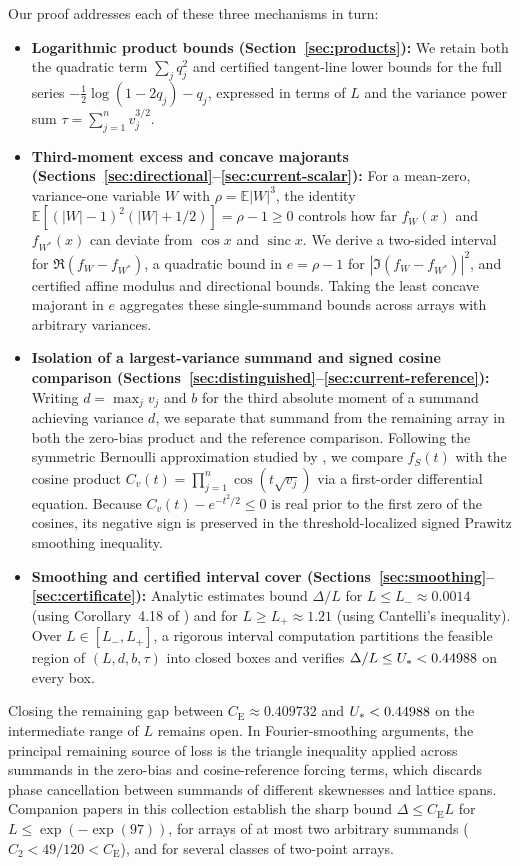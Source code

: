\documentclass[11pt]{article}
\numberwithin{equation}{section}
\theoremstyle{remark}
\DeclareMathOperator{\sinc}{sinc}
\newcommand{\E}{\mathbb E}
\newcommand{\CE}{C_{\mathrm E}}
\begin{document}
Our proof addresses each of these three mechanisms in turn:
\begin{itemize}[leftmargin=2em]
\item \textbf{Logarithmic product bounds (Section~\ref{sec:products}):} We
retain both the quadratic term $\sum_jq_j^2$ and certified tangent-line
lower bounds for the full series $-\frac12\log(1-2q_j)-q_j$, expressed in
terms of $L$ and the variance power sum $\tau=\sum_{j=1}^n v_j^{3/2}$.
\item \textbf{Third-moment excess and concave majorants
(Sections~\ref{sec:directional}--\ref{sec:current-scalar}):} For a
mean-zero, variance-one variable $W$ with $\rho=\E|W|^3$, the identity
$\E[(|W|-1)^2(|W|+1/2)]=\rho-1\ge0$ controls how far $f_W(x)$ and
$f_{W^*}(x)$ can deviate from $\cos x$ and $\sinc x$. We derive a two-sided
interval for $\Re(f_W-f_{W^*})$, a quadratic bound in $e=\rho-1$ for
$|\Im(f_W-f_{W^*})|^2$, and certified affine modulus and directional bounds.
Taking the least concave majorant in $e$ aggregates these single-summand
bounds across arrays with arbitrary variances.
\item \textbf{Isolation of a largest-variance summand and signed cosine
comparison (Sections~\ref{sec:distinguished}--\ref{sec:current-reference}):}
Writing $d=\max_j v_j$ and $b$ for the third absolute moment of a summand
achieving variance $d$, we separate that summand from the remaining array in
both the zero-bias product and the reference comparison. Following the
symmetric Bernoulli approximation studied by \citet[Theorem~1.2 and Example~1.4]{MattnerShevtsova2019},
we compare $f_S(t)$ with the cosine product $C_v(t)=\prod_{j=1}^n\cos(t\sqrt{v_j})$
via a first-order differential equation. Because $C_v(t)-e^{-t^2/2}\le0$ is
real prior to the first zero of the cosines, its negative sign is preserved
in the threshold-localized signed Prawitz smoothing inequality.
\item \textbf{Smoothing and certified interval cover
(Sections~\ref{sec:smoothing}--\ref{sec:certificate}):} Analytic estimates
bound $\Delta/L$ for $L\le L_-\approx0.0014$ (using Corollary~4.18 of
\citet{Shevtsova2012}) and for $L\ge L_+\approx1.21$ (using Cantelli's
inequality). Over $L\in[L_-,L_+]$, a rigorous interval computation partitions
the feasible region of $(L,d,b,\tau)$ into closed boxes and verifies
$\Delta/L\le U_*<0.44988$ on every box.
\end{itemize}

Closing the remaining gap between $\CE\approx0.409732$ and $U_*<0.44988$
on the intermediate range of $L$ remains open. In Fourier-smoothing
arguments, the principal remaining source of loss is the triangle inequality
applied across summands in the zero-bias and cosine-reference forcing terms,
which discards phase cancellation between summands of different skewnesses
and lattice spans. Companion papers in this collection establish the sharp
bound $\Delta\le\CE L$ for $L\le\exp(-\exp(97))$, for arrays of at most two
arbitrary summands ($C_2<49/120<\CE$), and for several classes of two-point
arrays.
\end{document}
